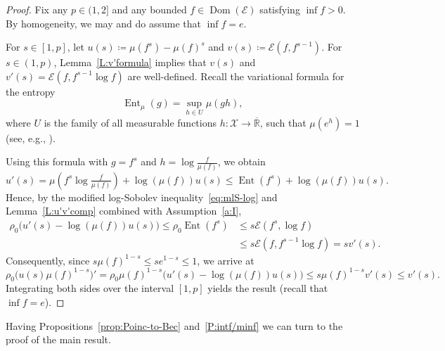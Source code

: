 \documentclass[a4paper]{amsart}
\theoremstyle{definition}
\theoremstyle{remark}
\numberwithin{equation}{section}
\newcommand*{\RR}{\mathbb{R}}
\newcommand{\calX}{\mathcal{X}}
\DeclareMathOperator{\Dom}{Dom} %
\newcommand*{\calE}{\mathcal{E}}
\DeclareMathOperator{\Ent}{Ent}	%
\begin{document}
\begin{proof}
Fix any $p\in(1,2]$ and any bounded $f\in \Dom(\calE)$ satisfying $\inf f>0$.
By homogeneity, we may and do assume that $\inf f =e$.

For $s\in[1,p]$, let $u(s)\coloneqq\mu(f^s) - \mu(f)^s$ and $v(s)\coloneqq\calE(f,f^{s-1})$.
For $s\in(1,p)$, Lemma~\ref{L:v'formula} implies that $v(s)$ and $v'(s)= \calE(f,f^{s-1}\log f)$ are well-defined. Recall the variational formula for the entropy
\begin{displaymath}
\Ent_\mu(g) = \sup_{h \in U} \mu(gh),
\end{displaymath}
where $U$ is the family of all measurable functions $h\colon \calX \to \overline{\RR}$, such that $\mu(e^h) = 1$ (see, e.g., \cite[Theorem 4.13]{MR3185193}).

Using this formula with $g = f^s$ and $h = \log \frac{f}{\mu(f)}$, we obtain
	\[
		u'(s) = \mu (f^s\log \tfrac{f}{\mu (f)}) + \log( \mu(f) )u(s)
		\le
		\Ent(f^s) + \log (\mu(f))u(s).
	\]
	Hence, by the modified log-Sobolev inequality~\eqref{eq:mlS-log} and Lemma~\ref{L:u'v'comp} combined with Assumption~\ref{a:I},
	\begin{align*}
		\rho_0 \bigl(u'(s) - \log(\mu(f)) u(s)\bigr)	
		\le \rho_0  \Ent(f^s)	
		&\le s \calE(f^s, \log f)\\
		&\le
		s\calE(f,f^{s-1}\log f) =s v'(s).
	\end{align*}
	Consequently, since $s\mu(f)^{1-s} \leq se^{1-s} \leq 1$, we arrive at
	\begin{equation*}
		\rho_0 \bigl(u(s)\mu(f)^{1-s}\bigr)'
		= \rho_0 \mu(f)^{1-s} \bigl(u'(s) - \log(\mu(f)) u(s)\bigr)	
		\leq 	s\mu(f)^{1-s} v'(s) \leq v'(s).
	\end{equation*}
	Integrating both sides over the interval $[1,p]$ yields the result (recall that $\inf f = e$).
\end{proof}

Having Propositions~\ref{prop:Poinc-to-Bec} and~\ref{P:intf/minf} we can turn to the proof of the main result.
\end{document}
